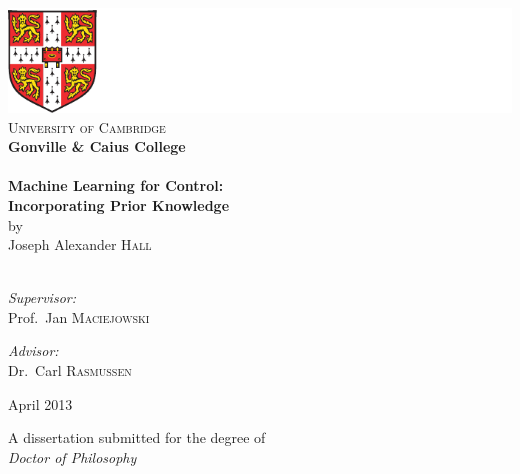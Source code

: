 \begin{titlepage}

\begin{center}
\includegraphics[scale=2.2]{figs/logo.pdf}\\[1cm]
\textsc{\LARGE University of Cambridge}\\[0.2cm]
{\large\bf Gonville \& Caius College} \\[1.5cm]

\HRule \\[0.2cm]
{ \huge \bfseries Machine Learning for Control: \\[0.25cm] \Large Incorporating Prior Knowledge }\\[0.3cm]
{\large by} \\[0.3cm]
{\Large Joseph Alexander \textsc{Hall}} \\[0.2cm]
\HRule \\[1.5cm]


\begin{minipage}{0.45\textwidth}
\begin{flushleft} \large
\emph{Supervisor:}\\
Prof.~Jan \textsc{Maciejowski}
\end{flushleft}
\end{minipage}
\begin{minipage}{0.45\textwidth}
\begin{flushright} \large
\emph{Advisor:} \\
Dr.~Carl \textsc{Rasmussen}
\end{flushright}
\end{minipage}

\vfill
{\Large April 2013}
\vfill

A dissertation submitted for the degree of \\[0.2cm]
{\Large
\textit{Doctor of Philosophy}
}

\end{center}
\end{titlepage}